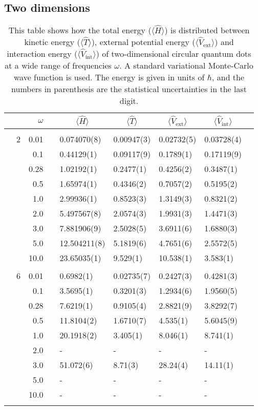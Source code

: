 \subsection{Two dimensions}
\begin{table}[H]
	\caption{This table shows how the total energy ($\langle\hat{H}\rangle$) is distributed between kinetic energy ($\langle\hat{T}\rangle$), external potential energy ($\langle\hat{V}_{\text{ext}}\rangle$) and interaction energy ($\langle\hat{V}_{\text{int}}\rangle$) of two-dimensional circular quantum dots at a wide range of frequencies $\omega$. A standard variational Monte-Carlo wave function is used. The energy is given in units of $\hbar$, and the numbers in parenthesis are the statistical uncertainties in the last digit.}
	\label{tab:splitfrequencyQDVMC}
	\begin{tabularx}{\textwidth}{R{1cm}rrcR{2.3cm}R{2.3cm}R{2.3cm}R{2.3cm}R{1cm}} \hline\hline
		&\makecell{\\ \phantom{$N$} \\ \phantom{=}} & $\omega$ &&  &  &  &  & \\ \hline \\
		&2 & 0.01 && 0.074070(8) & 0.00947(3) & 0.02732(5) & 0.03728(4) \\
		&& 0.1 && 0.44129(1) & 0.09117(9) & 0.1789(1) & 0.17119(9) \\
		&& 0.28 && 1.02192(1) & 0.2477(1) & 0.4256(2) & 0.3487(1) \\
		&& 0.5 && 1.65974(1) & 0.4346(2) & 0.7057(2) & 0.5195(2)\\
		&& 1.0 && 2.99936(1) & 0.8523(3) & 1.3149(3) & 0.8321(2)\\
		&& 2.0 && 5.497567(8) & 2.0574(3) & 1.9931(3) & 1.4471(3) \\
		&& 3.0 && 7.881906(9) & 2.5028(5) & 3.6911(6) & 1.6880(3) \\ 
		&& 5.0 && 12.504211(8) & 5.1819(6) & 4.7651(6) & 2.5572(5) \\
		&& 10.0 && 23.65035(1) & 9.529(1) & 10.538(1) & 3.583(1) \\
		\hdashline \\
		
		&6 & 0.01 && 0.6982(1) & 0.02735(7) & 0.2427(3) & 0.4281(3) \\
		&& 0.1 && 3.5695(1) & 0.3201(3) & 1.2934(6) & 1.9560(5) \\
		&& 0.28 && 7.6219(1) & 0.9105(4) & 2.8821(9) & 3.8292(7) \\
		&& 0.5 && 11.8104(2) & 1.6710(7) & 4.535(1) & 5.6045(9)\\
		&& 1.0 && 20.1918(2) & 3.405(1) & 8.046(1) & 8.741(1)\\
		&& 2.0 && - & - & - & -\\
		&& 3.0 && 51.072(6) & 8.71(3) & 28.24(4) & 14.11(1) \\ 
		&& 5.0 && - & - & - & -\\
		&& 10.0 && - & - & - & -\\
		\hdashline \\
		

\end{tabularx}
\end{table}
